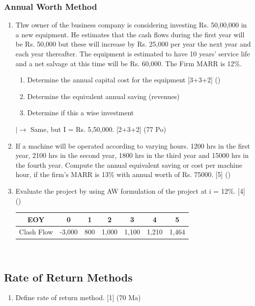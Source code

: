 \documentclass[12pt]{article}
\begin{document}
		\subsubsection{Annual Worth Method}
			\begin{enumerate}[noitemsep, topsep = 0pt]
				\item Thw owner of the business company is considering investing Rs. 50,00,000 in a new equipment. He estimates that the cash flows during the first year will be Rs. 50,000 but these will increase by Rs. 25,000 per year the next year and each year thereafter. The equipment is estimated to have 10 years' service life and a net salvage at this time will be Rs. 60,000. The Firm MARR is 12\%.
				\begin{enumerate}[noitemsep, topsep = 0pt, label = \alph*]
					\item Determine the annual capital cost for the equipment \hfill [3+3+2] ()
					\item Determine the equivalent annual saving (revenues)
					\item Determine if this a wise investment
				\end{enumerate}
				$\left|\rightarrow\right.$ Same, but I = Rs. 5,50,000. \hfill [2+3+2] (77 Po)
				
				\item If a machine will be operated according to varying hours. 1200 hrs in the first year, 2100 hrs in the second year, 1800 hrs in the third year and 15000 hrs in the fourth year. Compute the annual equivalent saving or cost per machine hour, if the firm's MARR is 13\% with annual worth of Rs. 75000. \hfill [5] ()
				
				\item Evaluate the project by using AW formulation of the project at i = 12\%. \hfill [4] ()\\
				\begin{tabular}{|c|c|c|c|c|c|c|}
					\hline
					EOY & 0 & 1 & 2 & 3 & 4 & 5\\ \hline
					Clash Flow & -3,000 & 800 & 1,000 & 1,100 & 1,210 & 1,464\\ \hline
				\end{tabular}\\[0pt]
			\end{enumerate}

	\subsection{Rate of Return Methods}
		\begin{enumerate} [noitemsep, topsep = 0pt]
			\item Define rate of return method. \hfill [1] (70 Ma)
		\end{enumerate}
    
\end{document}

